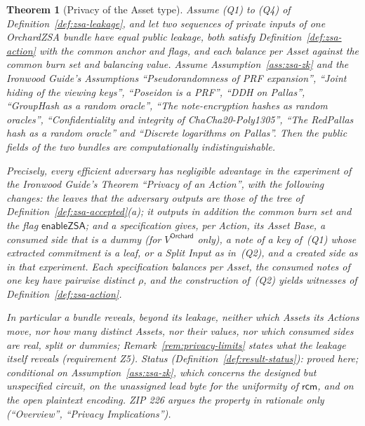 \documentclass[11pt,a4paper]{article}
\newtheorem{theorem}{Theorem}[section]
\theoremstyle{definition}
\newcommand{\rcm}{\ensuremath{\mathsf{rcm}}}
\begin{document}
\begin{theorem}[Privacy of the Asset type]\label{thm:asset-privacy}
Assume (Q1) to (Q4) of Definition~\ref{def:zsa-leakage}, and let two
sequences of private inputs of one OrchardZSA bundle have equal public
leakage, both satisfy Definition~\ref{def:zsa-action} with the common anchor
and flags, and each balance per Asset against the common burn set and
balancing value. Assume Assumption~\ref{ass:zsa-zk} and the \emph{Ironwood
Guide}'s Assumptions ``Pseudorandomness of PRF expansion'', ``Joint hiding
of the viewing keys'', ``Poseidon is a PRF'', ``DDH on Pallas'', ``GroupHash
as a random oracle'', ``The note-encryption hashes as random oracles'',
``Confidentiality and integrity of ChaCha20-Poly1305'', ``The RedPallas hash
as a random oracle'' and ``Discrete logarithms on Pallas''. Then the public
fields of the two bundles are computationally indistinguishable.

Precisely, every efficient adversary has negligible advantage in the
experiment of the \emph{Ironwood Guide}'s Theorem ``Privacy of an Action'',
with the following changes: the leaves that the adversary outputs are those
of the tree of Definition~\ref{def:zsa-accepted}(a); it outputs in addition
the common burn set and the flag $\mathsf{enableZSA}$; and a specification
gives, per Action, its Asset Base, a consumed side that is a dummy (for
$V^{\mathsf{Orchard}}$ only), a note of a key of~(Q1) whose extracted
commitment is a leaf, or a Split Input as in~(Q2), and a created side as in
that experiment. Each specification balances per Asset, the consumed notes
of one key have pairwise distinct $\rho$, and the construction of~(Q2)
yields witnesses of Definition~\ref{def:zsa-action}.

In particular a bundle reveals, beyond its leakage, neither which Assets its
Actions move, nor how many distinct Assets, nor their values, nor which
consumed sides are real, split or dummies; Remark~\ref{rem:privacy-limits}
states what the leakage itself reveals (requirement Z5). Status
(Definition~\ref{def:result-status}): proved here; conditional on
Assumption~\ref{ass:zsa-zk}, which concerns the designed but unspecified
circuit, on the unassigned lead byte for the uniformity of $\rcm$, and on
the open plaintext encoding. ZIP 226 argues the property in rationale only
(``Overview'', ``Privacy Implications'').
\end{theorem}
\end{document}
